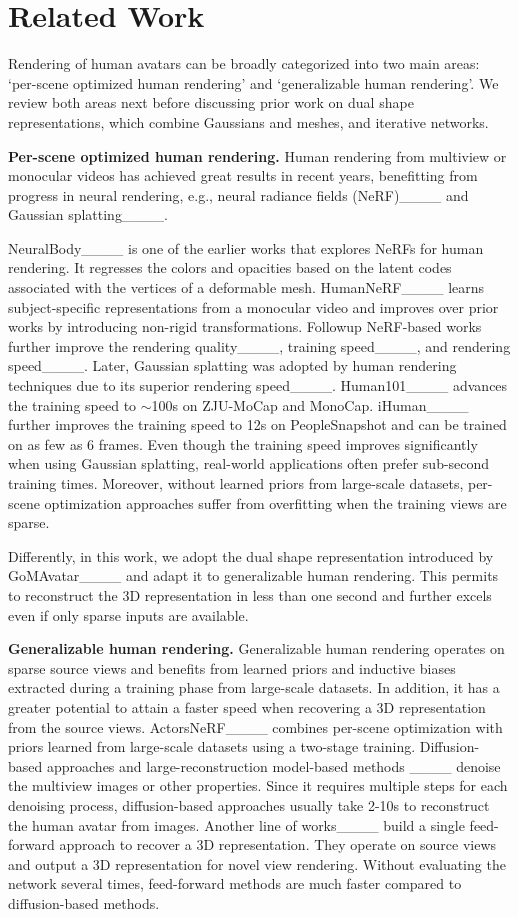 \section{Related Work}
Rendering of human avatars can be broadly categorized into two main areas: `per-scene optimized human rendering' and `generalizable human rendering'. We review both areas next before discussing prior work on dual shape representations, which combine Gaussians and meshes, and iterative networks. 

\textbf{Per-scene optimized human rendering.} Human rendering from multiview or monocular videos has achieved great results in recent years, benefitting from  progress in neural rendering, e.g., neural radiance fields (NeRF)____ and Gaussian splatting____.

NeuralBody____ is one of the earlier works that explores NeRFs for human rendering. It regresses the colors and opacities based on the latent codes associated with the vertices of a deformable mesh. HumanNeRF____  learns subject-specific representations from a monocular video and improves over prior works by introducing non-rigid transformations.
Followup NeRF-based works further improve the rendering quality____, training speed____, and rendering speed____. %
Later, Gaussian splatting was adopted by human rendering techniques due to its superior rendering speed____. 
Human101____ advances the training speed to $\sim$100s on ZJU-MoCap and MonoCap. iHuman____ further improves the training speed to 12s on PeopleSnapshot and can be trained on as few as 6 frames.
Even though the training speed improves significantly when using Gaussian splatting, real-world applications often prefer sub-second training times. Moreover, without learned priors from large-scale datasets,  per-scene optimization approaches suffer from overfitting when the training views are sparse.

Differently, in this work, we adopt the dual shape representation introduced by GoMAvatar____ and adapt it to generalizable human rendering. This permits to  reconstruct the 3D representation in less than one second and further excels even if only sparse inputs are available. %

\textbf{Generalizable human rendering.} Generalizable human rendering operates on sparse source views and benefits from learned priors and inductive biases extracted during a training phase from large-scale datasets. In addition, it has a greater potential to attain a faster speed when recovering a 3D representation from the source views. ActorsNeRF____ combines per-scene optimization with priors learned from large-scale datasets using a two-stage training. Diffusion-based approaches and large-reconstruction model-based methods ____ denoise the multiview images or other properties. %
Since it requires multiple steps for each denoising process, diffusion-based approaches usually take 2-10s to reconstruct the human avatar from images. Another line of works____ build a single feed-forward approach to recover a 3D representation. They operate on source views and output a  3D representation for novel view rendering. Without evaluating the network  several times, feed-forward methods are much faster  compared to diffusion-based methods.

